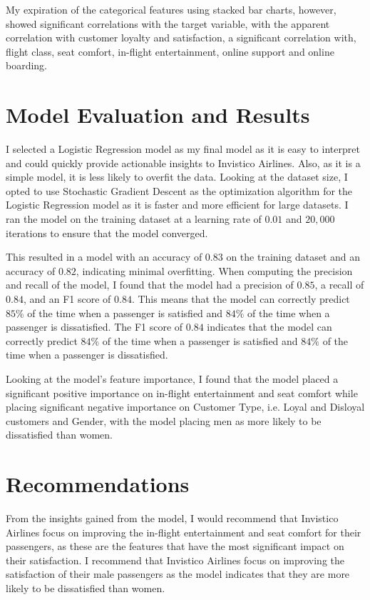 \documentclass[12pt letter]{report}
\begin{document}
My expiration of the categorical features using stacked bar charts, however, showed significant correlations with the
target variable, with the apparent correlation  with customer loyalty and satisfaction, a significant correlation with,
flight class, seat comfort, in-flight entertainment, online support and online boarding.

\section*{Model Evaluation and Results}

I selected a Logistic Regression model as my final model as it is easy to interpret and could quickly provide actionable
insights to Invistico Airlines. Also, as it is a simple model, it is less likely to overfit the data. Looking at the dataset size, I opted to use Stochastic Gradient Descent as the optimization algorithm for the Logistic Regression
model as it is faster and more efficient for large datasets. I ran the model on the training dataset at a learning rate
of $0.01$ and $20,000$ iterations to ensure that the model converged.

This resulted in a model with an accuracy of $0.83$ on the training dataset and an accuracy of $0.82$, indicating
minimal overfitting. When computing the precision and recall of the model, I found that the model had a precision of $0.85$, a
recall of $0.84$, and an F1 score of $0.84$. This means that the model can correctly predict $85\%$ of the time
when a passenger is satisfied and $84\%$ of the time when a passenger is dissatisfied. The F1 score of $0.84$ indicates
that the model can correctly predict $84\%$ of the time when a passenger is satisfied and $84\%$ of the time when a passenger is dissatisfied.

Looking at the model's feature importance, I found that the model placed a significant positive importance on in-flight
entertainment and seat comfort while placing significant negative importance on Customer Type, i.e. Loyal and
Disloyal customers and Gender, with the model placing men as more likely to be dissatisfied than women.

\section*{Recommendations}

From the insights gained from the model, I would recommend that Invistico Airlines focus on improving the in-flight
entertainment and seat comfort for their passengers, as these are the features that have the most significant impact on
their satisfaction. I recommend that Invistico Airlines focus on improving the satisfaction
of their male passengers as the model indicates that they are more likely to be dissatisfied than women.
\end{document}
